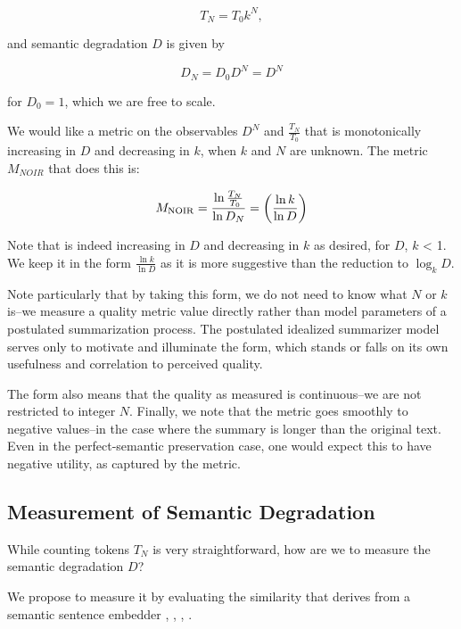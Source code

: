 \documentclass{article}
\begin{document}
\begin{equation}
	\label{eq:tokencount}
    T_N = T_0 k^N,
\end{equation}

and semantic degradation $D$ is given by

\begin{equation}
	\label{eq:degradationsteps}
	D_N = D_0 D^N = D^N
\end{equation}

for $D_0=1$, which we are free to scale.

We would like a metric on the observables $D^N$ and $\frac{T_N}{T_0}$ that is monotonically increasing in $D$ and decreasing in $k$, when $k$ and $N$ are unknown. 
The metric $M_{NOIR}$ that does this is:

\begin{equation}
M_{\rm NOIR} = \frac{\ln\frac{T_N}{T_0} }{\ln D_N } =  \left(  \frac{\ln k}{\ln D} \right)
\end{equation}

Note that is indeed increasing in $D$ and decreasing in $k$ as desired, for $D$, $k$ < 1.
We keep it in the form $\frac{\ln k}{\ln D}$ as it is more suggestive than the reduction to $\log_k D$.

Note particularly that by taking this form, we do not need to know what $N$ or $k$ is--we measure a quality metric value directly rather than model parameters of a postulated summarization process.  
The postulated idealized summarizer model serves only to motivate and illuminate the form, which stands or falls on its own usefulness and correlation to perceived quality.

The form also means that the quality as measured is continuous--we are not restricted to integer $N$.
Finally, we note that the metric goes smoothly to negative values--in the case where the summary is longer than the original text.  
Even in the perfect-semantic preservation case, one would expect this to have negative utility, as captured by the metric.


\subsection{Measurement of Semantic Degradation}

While counting tokens $T_N$ is very straightforward, how are we to measure the semantic degradation $D$?

We propose to measure it by evaluating the similarity that
derives from a semantic sentence embedder \citep{hill-etal-2016-learning}, \citet{DBLP:journals/corr/abs-2002-10957}, \citet{DBLP:journals/corr/SutskeverVL14}, \citep{muennighoff2022mteb}.
\end{document}
